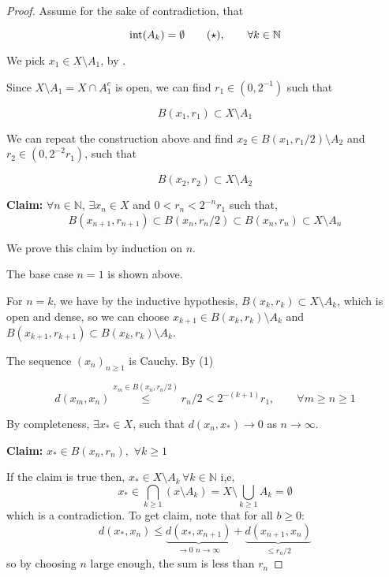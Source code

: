 \documentclass{article}
\begin{document}
    \begin{proof}
        Assume for the sake of contradiction, that

        \begin{equation*}
            \textrm{int}(A_k)=\emptyset \tag{$\star$}, \qquad \forall k \in \mathbb{N}
        \end{equation*}
        
        We pick $x_1\in X\setminus A_1$, by .
        
        Since $X\setminus A_1=X\cap A_1^c$ is open, we can find $r_1 \in (0,2^{-1})$ such that
        
        $$B(x_1,r_1)\subset X\setminus A_1$$  
        
        We can repeat the construction above and find $x_2\in B(x_1,r_1/2)\setminus A_2$ and $r_2 \in (0, 2^{-2} r_1)$, such that 
        
        $$B(x_2,r_2)\subset X\setminus A_2$$
        
        \textbf{Claim:} $\forall n \in \mathbb{N}$, $\exists x_n \in X$ and $0<r_n<2^{-n}r_1$ such that,  
        \begin{equation*}
            B(x_{n+1},r_{n+1})\subset B(x_n,r_n/2)\subset B(x_n,r_n)\subset X\setminus A_n
        \end{equation*}
            
        We prove this claim by induction on $n$.   
        
        The base case $n=1$ is shown above.    
        
        For $n=k$, we have by the inductive hypothesis, $B(x_k, r_k) \subset X \setminus A_k$, which is open and dense, so we can choose $x_{k+1} \in B(x_k, r_k) \setminus A_{k}$ and $B(x_{k+1}, r_{k+1}) \subset B(x_k, r_k) \setminus A_{k}$.  
        
        The sequence $(x_n)_{n \geq 1}$ is Cauchy. By (1)
        
        $$d(x_m,x_n)\stackrel{x_m\in B(x_n,r_n/2)}{\leq}r_n/2<2^{-(k+1)}r_1, \qquad \forall m\geq n\geq1$$
        
        By completeness, $\exists x_*\in X$, such that $d(x_n,x_*)\to0$ as $n\to \infty$.  
    
        \textbf{Claim:} $x_*\in B(x_n,r_n),\,\,\forall k\geq 1$  
        
        If the claim is true then,  $x_*\in X\setminus A_k\,\forall k \in \mathbb{N}$ i,e, 
        $$x_*\in\bigcap_{k\geq1}(x\setminus A_k)=X\setminus\bigcup_{k\geq1}A_k=\emptyset$$
        which is a contradiction. 
        To get claim, note that for all $b\geq0$:
        $$
        d(x_*,x_n)\leq \underbrace{{d(x_*,x_{n+1})}}_{\to0\,\,n\to\infty}+\underbrace{d(x_{n+1},x_n)}_{\leq r_n/2}
        $$
        so by choosing $n$ large enough, the sum is less than $r_n$
    \end{proof} 
\end{document}
